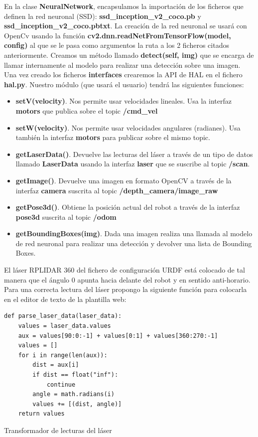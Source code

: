 En la clase \textbf{NeuralNetwork}, encapsulamos la importación de los ficheros que definen la red neuronal (SSD): \textbf{ssd\_inception\_v2\_coco.pb} y \textbf{ssd\_inception\_v2\_coco.pbtxt}. La creación de la red neuronal se usará con OpenCv usando la función \textbf{cv2.dnn.readNetFromTensorFlow(model, config)} al que se le pasa como argumentos la ruta a los 2 ficheros citados anteriormente. Creamos un método llamado \textbf{detect(self, img)} que se encarga de llamar internamente al modelo para realizar una detección sobre una imagen.\\

Una vez creado los ficheros \textbf{interfaces} crearemos la API de HAL en el fichero \textbf{hal.py}. Nuestro módulo (que usará el usuario) tendrá las siguientes funciones:
\begin{itemize}
	\item \textbf{setV(velocity)}. Nos permite usar velocidades lineales. Usa la interfaz \textbf{motors} que publica sobre el topic \textbf{/cmd\_vel}
	\item \textbf{setW(velocity)}. Nos permite usar velocidades angulares (radianes). Usa también la interfaz \textbf{motors} para publicar sobre el mismo topic.
	\item \textbf{getLaserData()}. Devuelve las lecturas del láser a través de un tipo de datos llamado \textbf{LaserData} usando la interfaz \textbf{laser} que se suscribe al topic \textbf{/scan}.
	\item \textbf{getImage()}. Devuelve una imagen en formato OpenCV a través de la interfaz \textbf{camera} suscrita al topic \textbf{/depth\_camera/image\_raw}
	\item \textbf{getPose3d()}. Obtiene la posición actual del robot a través de la interfaz \textbf{pose3d} suscrita al topic \textbf{/odom}
	\item \textbf{getBoundingBoxes(img)}. Dada una imagen realiza una llamada al modelo de red neuronal para realizar una detección y devolver una lista de Bounding Boxes.  
\end{itemize}

El láser RPLIDAR 360 del fichero de configuración URDF está colocado de tal manera que el ángulo 0 apunta hacia delante del robot y en sentido anti-horario. Para una correcta lectura del láser propongo la siguiente función para colocarla en el editor de texto de la plantilla web:

\begin{code}[H]
\begin{lstlisting}
def parse_laser_data(laser_data):
    values = laser_data.values
    aux = values[90:0:-1] + values[0:1] + values[360:270:-1]
    values = []
    for i in range(len(aux)):
        dist = aux[i]
        if dist == float("inf"):
            continue
        angle = math.radians(i)
        values += [(dist, angle)]
    return values
\end{lstlisting}
\caption[Transformador de lecturas del láser]{Transformador de lecturas del láser}
\label{cod:holamundo_cplusplus}
\end{code}

